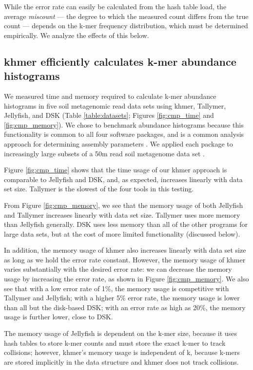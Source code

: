 \documentclass[10pt]{article}
\begin{document}
While the error rate can easily be calculated from the hash
table load, the average {\em miscount} --- the degree to which the measured count
differs from the true count --- depends on the k-mer frequency
distribution, which must be determined empirically.  We analyze the
effects of this below.

\subsection*{khmer efficiently calculates k-mer abundance histograms}

We measured time and memory required to calculate k-mer abundance
histograms in five soil metagenomic read data sets using khmer,
Tallymer, Jellyfish, and DSK (Table \ref{table:datasets}; Figures \ref{fig:cmp_time} and
\ref{fig:cmp_memory}).  We chose to benchmark abundance histograms because
this functionality is common to all four software packages, and is a
common analysis approach for determining assembly parameters \cite{Chikhi:2014aa}.
We applied each package to increasingly large subsets of a 50m read soil
metagenome data set \cite{Howe2012}.

Figure \ref{fig:cmp_time} shows that the time usage of our khmer approach
is comparable to Jellyfish and DSK, and, as expected, increases linearly
with data set size. Tallymer is the slowest of the four tools in this testing.

From Figure \ref{fig:cmp_memory}, we see that the memory usage of both
Jellyfish and Tallymer increases linearly with data set size. Tallymer uses more 
memory than Jellyfish generally.  DSK uses less memory
than all of the other programs for large data sets, but at the cost
of more limited functionality (discussed below).

In addition, the memory usage of khmer also increases linearly with
data set size as long as we hold the error rate constant.  However,
the memory usage of khmer varies substantially with the desired error
rate: we can decrease the memory usage by increasing the
error rate, as shown in Figure \ref{fig:cmp_memory}.  We also
see that with a low error rate of 1\%, the
memory usage is competitive with Tallymer and Jellyfish; with a higher 5\%
error rate, the memory usage is lower than all but the
disk-based DSK; with an error rate as high as 20\%, the memory usage is further lower,
close to DSK.

The memory usage of Jellyfish is dependent on the k-mer
size, because it uses hash tables to store k-mer counts and must store
the exact k-mer to track collisions; however, khmer's memory
usage is independent of k, because k-mers are stored implicitly in
the data structure and khmer does not track collisions.
\end{document}
